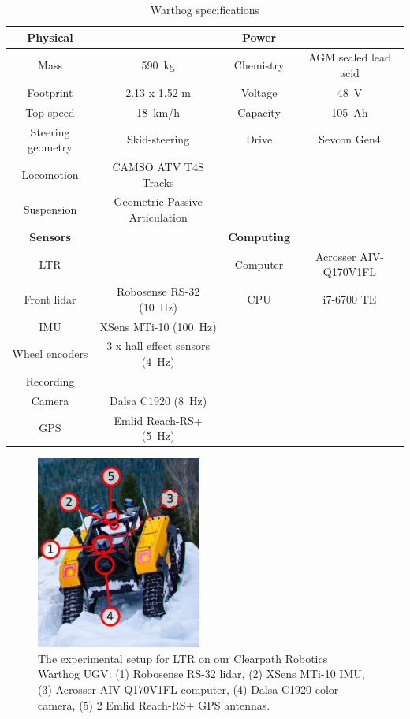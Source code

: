\begin{table}[htpb]
	\caption{Warthog specifications} \label{tab:warthog_specs}
	\begin{center}
		\begin{tabular}{c c | c c}
			\textbf{Physical} &  & \textbf{Power} & \\
			\hline
			Mass & \SI{590}{kg} & Chemistry & AGM sealed lead acid \\ 
			Footprint & 2.13 x 1.52 m & Voltage & \SI{48}{V} \\ 
			Top speed & \SI{18}{km/h} & Capacity & \SI{105}{Ah} \\ 
			Steering geometry & Skid-steering  & Drive & Sevcon Gen4 \\
			Locomotion & CAMSO ATV T4S Tracks \\
			Suspension & Geometric Passive Articulation \\
			\hline
			\textbf{Sensors} & & \textbf{Computing} \\
			\hline
			\ac{LTR} & & Computer & Acrosser AIV-Q170V1FL  \\
			Front lidar & Robosense RS-32 (\SI{10}{Hz}) & CPU & i7-6700 TE \\
			\ac{IMU} & XSens MTi-10 (\SI{100}{Hz}) \\ 
			Wheel encoders & 3 x hall effect sensors (\SI{4}{Hz}) \\
			Recording & &   \\
			Camera & Dalsa C1920 (\SI{8}{Hz})  \\
			\ac{GPS} & Emlid Reach-RS+ (\SI{5}{Hz}) \\
		\end{tabular}
	\end{center}
\end{table}

\begin{figure}
	\centering
	\includegraphics[height=2.5in]{figs/warthog_hardware.pdf}
	\caption{The experimental setup for \ac{LTR} on our Clearpath Robotics Warthog \ac{UGV}: (1) Robosense RS-32 lidar, (2) XSens MTi-10 \ac{IMU}, (3) Acrosser AIV-Q170V1FL computer, (4) Dalsa C1920 color camera, (5) 2 Emlid Reach-RS+ \ac{GPS} antennas.}
	\label{fig:warthog}
\end{figure}

